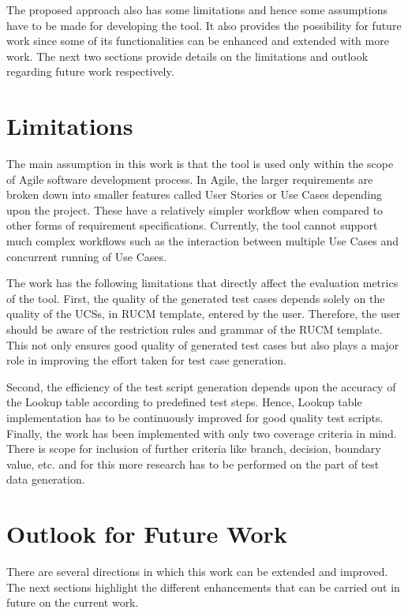 The proposed approach also has some limitations and hence some assumptions have to be made for developing the tool. It also provides the possibility for future work since some of its functionalities can be enhanced and extended with more work. The next two sections provide details on the limitations and outlook regarding future work respectively.

 
\section{Limitations}
The main assumption in this work is that the tool is used only within the scope of Agile software development process. In Agile, the larger requirements are broken down into smaller features called User Stories or Use Cases depending upon the project. These have a relatively simpler workflow when compared to other forms of requirement specifications. Currently, the tool cannot support much complex workflows such as the interaction between multiple Use Cases and concurrent running of Use Cases.

The work has the following limitations that directly affect the evaluation metrics of the tool. First, the quality of the generated test cases depends solely on the quality of the UCSs, in RUCM template, entered by the user. Therefore, the user should be aware of the restriction rules and grammar of the RUCM template. This not only ensures good quality of generated test cases but also plays a major role in improving the effort taken for test case generation. 

Second, the efficiency of the test script generation depends upon the accuracy of the Lookup table according to predefined test steps. Hence, Lookup table implementation has to be continuously improved for good quality test scripts. Finally, the work has been implemented with only two coverage criteria in mind. There is scope for inclusion of further criteria like branch, decision, boundary value, etc. and for this more research has to be performed on the part of test data generation.


\section{Outlook for Future Work}
There are several directions in which this work can be extended and improved. The next sections highlight the different enhancements that can be carried out in future on the current work.

